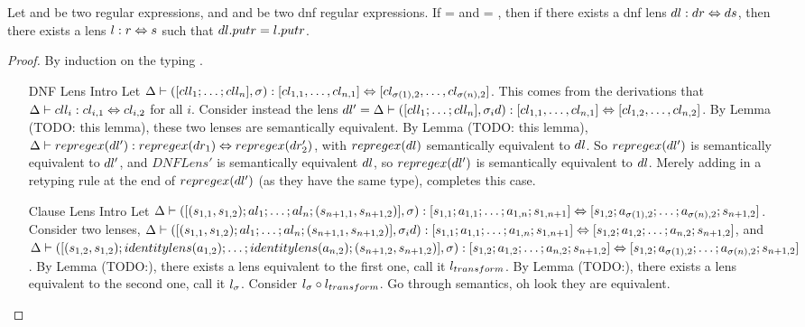 \begin{theorem}[Soundness]
Let \Regex{} and \RegexAlt{} be two regular expressions, and \DNFRegex{} and \DNFRegexAlt{} be two dnf regular expressions.
If \LanguageOf{\Regex{}} = \LanguageOf{\DNFRegex{}} and \LanguageOf{\RegexAlt} = \LanguageOf{\DNFRegexAlt{}},
then if there exists a dnf lens $dl : dr \Leftrightarrow ds$,
then there exists a lens $l : r \Leftrightarrow s$ such that
$dl.putr = l.putr$.
\begin{proof}
By induction on the typing \DNFLens{}.
\begin{enumerate}
\item[DNF Lens Intro] Let $\Delta \vdash ([cll_1 ; \ldots ; cll_n],\sigma) : [cl_{1,1}, \ldots, cl_{n,1}] \Leftrightarrow [cl_{\sigma(1),2}, \ldots, cl_{\sigma(n),2}]$.
This comes from the derivations that $\Delta \vdash cll_i : cl_{i,1} \Leftrightarrow cl_{i,2}$ for all $i$.
Consider instead the lens $dl' = \Delta \vdash ([cll_1 ; \ldots ; cll_n],\sigma_id) : [cl_{1,1}, \ldots, cl_{n,1}] \Leftrightarrow[cl_{1,2}, \ldots, cl_{n,2}]$.
By Lemma (TODO: this lemma), these two lenses are semantically equivalent.
By Lemma (TODO: this lemma), $\Delta \vdash repregex(dl') : repregex(dr_1) \Leftrightarrow repregex(dr_2')$, with $repregex(dl)$ semantically equivalent to $dl$.
So $repregex(dl')$ is semantically equivalent to $dl'$, and $DNFLens'$ is semantically equivalent $dl$, so $repregex(dl')$ is
semantically equivalent to $dl$.  Merely adding in a retyping rule at
the end of $repregex(dl')$ (as they have the same type), completes this case.
\item[Clause Lens Intro] Let $\Delta \vdash ([(s_{1,1},s_{1,2}) ; al_1 ; \ldots ; al_n ; (s_{n+1,1},s_{n+1,2})],\sigma) : [s_{1,1};a_{1,1}; \ldots ; a_{1,n} ; s_{1,n+1}] \Leftrightarrow [s_{1,2};a_{\sigma(1),2}; \ldots ; a_{\sigma(n),2} ; s_{n+1,2}]$.
Consider two lenses, $\Delta \vdash ([(s_{1,1},s_{1,2}) ; al_1 ; \ldots ; al_n ; (s_{n+1,1},s_{n+1,2})],\sigma_id) : [s_{1,1};a_{1,1}; \ldots ; a_{1,n} ; s_{1,n+1}] \Leftrightarrow [s_{1,2};a_{1,2}; \ldots ; a_{n,2} ; s_{n+1,2}]$,
and $\Delta \vdash ([(s_{1,2},s_{1,2});identitylens(a_{1,2}); \ldots ; identitylens(a_{n,2}) ; (s_{n+1,2},s_{n+1,2})],\sigma) : [s_{1,2};a_{1,2}; \ldots ; a_{n,2} ; s_{n+1,2}] \Leftrightarrow [s_{1,2};a_{\sigma(1),2}; \ldots ; a_{\sigma(n),2} ; s_{n+1,2}]$.
By Lemma (TODO:), there exists a lens equivalent to the first one, call it $l_{transform}$.
By Lemma (TODO:), there exists a lens equivalent to the second one, call it $l_{\sigma}$.
Consider $l_{\sigma} \circ l_{transform}$.  Go through semantics, oh look they are equivalent.

\end{enumerate}
\end{proof}
\end{theorem}

